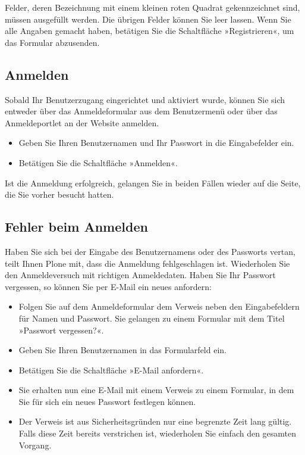 \documentclass[a4paper,12pt,ngerman]{manual}
\begin{document}
Felder, deren Bezeichnung mit einem kleinen roten Quadrat gekennzeichnet sind,
müssen ausgefüllt werden. Die übrigen Felder können Sie leer lassen. Wenn Sie
alle Angaben gemacht haben, betätigen Sie die Schaltfläche »Registrieren«,
um das Formular abzusenden.
\hypertarget{sec-tut-anmelden}{}

\subsection{Anmelden}

Sobald Ihr Benutzerzugang eingerichtet und aktiviert wurde, können Sie sich
entweder über das Anmeldeformular aus dem Benutzermenü oder über das
Anmeldeportlet an der Website anmelden.
\begin{itemize}
\item {} 
Geben Sie Ihren Benutzernamen und Ihr Passwort in die Eingabefelder ein.

\item {} 
Betätigen Sie die Schaltfläche »Anmelden«.

\end{itemize}

Ist die Anmeldung erfolgreich, gelangen Sie in beiden Fällen wieder auf die
Seite, die Sie vorher besucht hatten.


\subsection{Fehler beim Anmelden}

Haben Sie sich bei der Eingabe des Benutzernamens oder des Passworts vertan,
teilt Ihnen Plone mit, dass die Anmeldung fehlgeschlagen ist. Wiederholen Sie
den Anmeldeversuch mit richtigen Anmeldedaten. Haben Sie Ihr
Passwort vergessen, so können Sie per E-Mail ein neues anfordern:
\begin{itemize}
\item {} 
Folgen Sie auf dem Anmeldeformular dem Verweis neben den Eingabefeldern
für Namen und Passwort.  Sie gelangen zu einem Formular mit dem Titel
»Passwort vergessen?«.

\item {} 
Geben Sie Ihren Benutzernamen in das Formularfeld ein.

\item {} 
Betätigen Sie die Schaltfläche »E-Mail anfordern«.

\item {} 
Sie erhalten nun eine E-Mail mit einem Verweis zu einem Formular, in dem
Sie für sich ein neues Passwort festlegen können.

\item {} 
Der Verweis ist aus Sicherheitsgründen nur eine begrenzte Zeit lang
gültig. Falls diese Zeit bereits verstrichen ist, wiederholen Sie einfach
den gesamten Vorgang.

\end{itemize}
\end{document}
